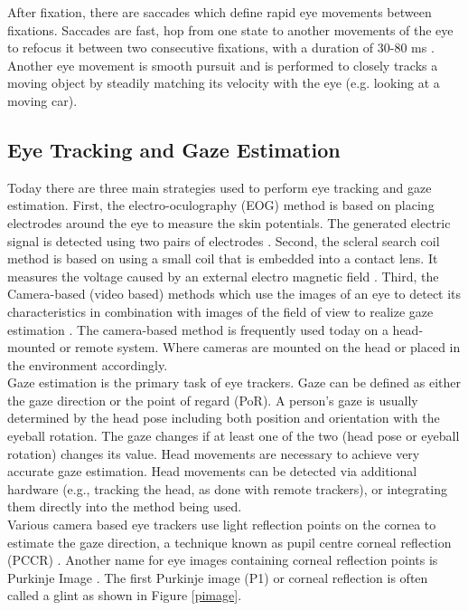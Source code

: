 After fixation, there are saccades which define rapid eye movements between fixations. Saccades are fast, hop from one state to another movements of the eye to refocus it between two consecutive fixations, with a duration of 30-80 ms \cite{13}. Another eye movement is smooth pursuit and is performed to closely tracks a moving object by steadily matching its velocity with the eye (e.g. looking at a moving car).


\subsection{Eye Tracking and Gaze Estimation}

Today there are three main strategies used to perform eye tracking and gaze estimation. First, the electro-oculography (EOG) method is based on placing electrodes around the eye to measure the skin potentials. The generated electric signal is detected using two pairs of electrodes \cite{3}. Second, the scleral search coil method is based on using a small coil that is embedded into a contact lens. It measures the voltage caused by an external electro magnetic field \cite{25}. Third, the Camera-based (video based) methods which use the images of an eye to detect its characteristics in combination with images of the field of view to realize gaze estimation \cite{13}. The camera-based method is frequently used today on a head-mounted or remote system. Where cameras are mounted on the head or placed in the environment accordingly.\\

Gaze estimation is the primary task of eye trackers. Gaze can be defined as either the gaze direction or the point of regard (PoR). A person’s gaze is usually determined by the head pose including both position and orientation with the eyeball rotation. The gaze changes if at least one of the two (head pose or eyeball rotation) changes its value. Head movements are necessary to achieve very accurate gaze estimation. Head movements can be detected via additional hardware (e.g., tracking the head, as done with remote trackers), or integrating them directly into the method being used.\\

Various camera based eye trackers use light reflection points on the cornea to estimate the gaze direction, a technique known as pupil centre corneal reflection (PCCR) \cite{1}. Another name for eye images containing corneal reflection points is Purkinje Image \cite{2}. The first Purkinje image (P1) or corneal reflection is often called a glint as shown in Figure \ref{pimage}.

